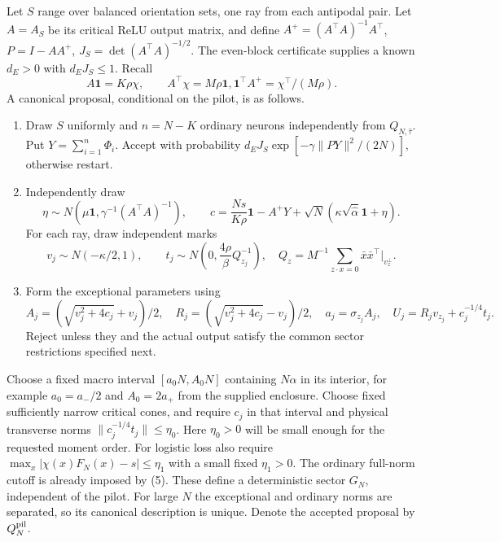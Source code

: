 \documentclass[11pt]{article}
\newcommand{\one}{\mathbf1}\newcommand{\TV}{\mathrm{TV}}
\begin{document}
Let $S$ range over balanced orientation sets, one ray from each antipodal
pair. Let $A=A_S$ be its critical ReLU output matrix, and define
$A^+=(A^\top A)^{-1}A^\top$, $P=I-AA^+$,
$J_S=\det(A^\top A)^{-1/2}$. The even-block certificate supplies a
known $d_E>0$ with $d_EJ_S\le1$. Recall
\[
 A\one=K\rho\chi,\qquad A^\top\chi=M\rho\one,
              \one^\top A^+=\chi^\top/(M\rho).          \tag{9}
\]
A canonical proposal, conditional on the pilot, is as follows.
\begin{enumerate}
\item Draw $S$ uniformly and $n=N-K$ ordinary neurons independently from
$Q_{N,\widehat\tau}$. Put $Y=\sum_{i=1}^n\Phi_i$. Accept with probability
$d_EJ_S\exp[-\gamma\|PY\|^2/(2N)]$, otherwise restart.
\item Independently draw
\[
 \eta\sim N\left(\mu\one,\gamma^{-1}(A^\top A)^{-1}\right),
 \qquad
 c=\frac{Ns}{K\rho}\one-A^+Y+
                    \sqrt N(\kappa\sqrt{\widehat\alpha}\one+\eta).
 \tag{10}
\]
For each ray, draw independent marks
\[
 v_j\sim N(-\kappa/2,1),\qquad
 t_j\sim N\left(0,\frac{4\rho}{\beta}Q_{z_j}^{-1}\right),
 \quad Q_z=M^{-1}\sum_{z\cdot x=0}\bar x\bar x^\top\big|_{v_z^\perp}.
 \tag{11}
\]
\item Form the exceptional parameters using
\[
 A_j=(\sqrt{v_j^2+4c_j}+v_j)/2,\quad
 R_j=(\sqrt{v_j^2+4c_j}-v_j)/2,\quad
 a_j=\sigma_{z_j}A_j,\quad U_j=R_jv_{z_j}+c_j^{-1/4}t_j.
\]
Reject unless they and the actual output satisfy the common sector
restrictions specified next.
\end{enumerate}

Choose a fixed macro interval $[a_0N,A_0N]$ containing $N\alpha$ in
its interior, for example $a_0=a_-/2$ and $A_0=2a_+$ from the
supplied enclosure. Choose fixed sufficiently narrow critical cones, and require
$c_j$ in that interval and physical transverse norms
$\|c_j^{-1/4}t_j\|\le\eta_0$. Here $\eta_0>0$ will be small enough
for the requested moment order. For logistic loss also require
$\max_x|\chi(x)F_N(x)-s|\le\eta_1$ with a small fixed $\eta_1>0$.
The ordinary full-norm cutoff is already imposed by (5).
These define a deterministic sector $G_N$, independent of the pilot.
For large $N$ the exceptional and ordinary norms are separated, so its
canonical description is unique. Denote the accepted proposal by
$Q_N^{\rm pil}$.
\end{document}
